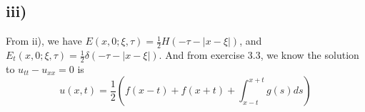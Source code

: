 \documentclass[a4paper, 11pt]{article}
\begin{document}
\begin{spacing}{1.5}
\subsection*{iii)}
From ii), we have $E(x,0;\xi,\tau) = \frac{1}{2} H(-\tau-|x-\xi|)$, and $ E_t(x,0;\xi,\tau) = \frac{1}{2}\delta(-\tau-|x-\xi|)$. And from exercise 3.3, we know the solution to $u_{tt} - u_{xx} =0$ is 
$$
u(x,t) = \frac{1}{2} \left( f(x-t) + f(x+t) + \int_{x-t}^{x+t} g(s) ds \right) 
$$








\end{spacing}
\end{document}
